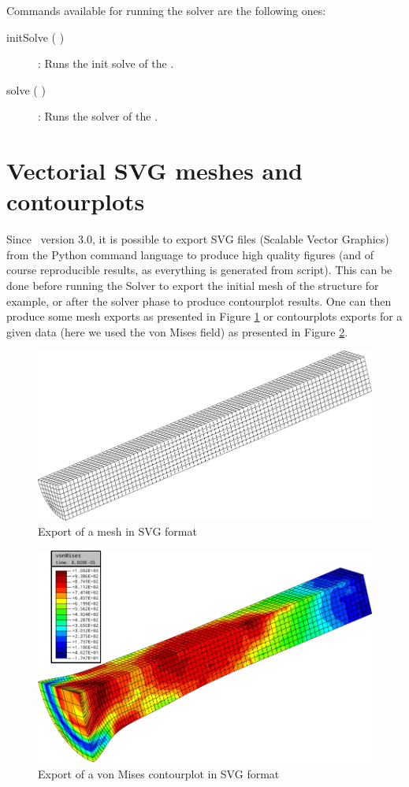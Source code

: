 Commands available for running the solver are the following ones:
\begin{description}
\item [{initSolve ( )}] : Runs the init solve of the \DynELA.
\item [{solve ( )}] : Runs the solver of the \DynELA.
\end{description}


\section{Vectorial SVG meshes and contourplots}
Since \DynELA~version 3.0, it is possible to export SVG files (Scalable Vector Graphics) from the Python command language to produce high quality figures (and of course reproducible results, as everything is generated from script). This can be done before running the Solver to export the initial mesh of the structure for example, or after the solver phase to produce contourplot results. One can then produce some mesh exports as presented in Figure \ref{fig:PL!SVG!Mesh} or contourplots exports for a given data (here we used the von Mises field) as presented in Figure \ref{fig:PL!SVG!Contourplot}.
\begin{figure}[h]
\begin{centering}
\includegraphics[width=0.5\columnwidth]{Figures/ProgrammingLanguage/mesh}
\par\end{centering}
\caption{Export of a mesh in SVG format\label{fig:PL!SVG!Mesh}}
\end{figure}

\begin{figure}[h]
\begin{centering}
\includegraphics[width=0.5\columnwidth]{Figures/ProgrammingLanguage/vonMisesCP}
\par\end{centering}
\caption{Export of a von Mises contourplot in SVG format\label{fig:PL!SVG!Contourplot}}
\end{figure}

